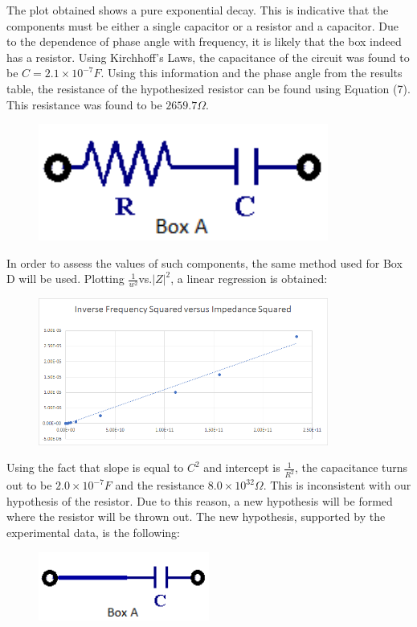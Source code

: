 \documentclass[a4paper]{article}
\begin{document}
The plot obtained shows a pure exponential decay. This is indicative that the components must be either a single capacitor or a resistor and a capacitor. Due to the dependence of phase angle with frequency, it is likely that the box indeed has a resistor. Using Kirchhoff's Laws, the capacitance of the circuit was found to be $C=2.1\times10^{-7}F$.  Using this information and the phase angle from the results table, the resistance of the hypothesized resistor can be found using Equation (7). This resistance was found to be $2659.7\Omega$. 

\begin{figure}[h]
\centering
\includegraphics[width=0.85\textwidth]{boxaconfig}
\end{figure}

In order to assess the values of such components, the same method used for Box D will be used. Plotting $\frac{1}{w^2}$vs.$|Z|^{2}$, a linear regression is obtained:
\begin{figure}[h]
\centering
\includegraphics[width=0.85\textwidth]{boxalinear}
\end{figure}

Using the fact that slope is equal to ${C^2}$ and intercept is $\frac{1}{R^{2}}$, the capacitance turns out to be $2.0\times 10^{-7}F$ and the resistance $8.0\times 10^{32}\Omega$. This is inconsistent with our hypothesis of the resistor. Due to this reason, a new hypothesis will be formed where the resistor will be thrown out. The new hypothesis, supported by the experimental data, is the following:
\begin{figure}[h]
\centering
\includegraphics[width=0.5\textwidth]{boxaconfig2}
\end{figure}
\clearpage
\end{document}
